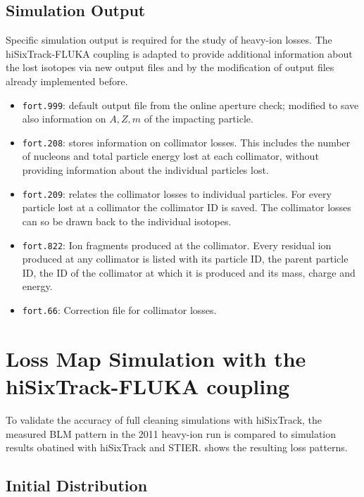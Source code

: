 \subsection{Simulation Output}
Specific simulation output is required for the study of heavy-ion losses. The hiSixTrack-FLUKA coupling is adapted to provide additional information about the lost isotopes via new output files and by the modification of output files already implemented before.

\begin{itemize}
  \item \texttt{fort.999}: default output file from the online aperture check; modified to save also information on $A,Z,m$ of the impacting particle.
  \item \texttt{fort.208}: stores information on collimator losses. This includes the number of nucleons and total particle energy lost at each collimator, without providing information about the individual particles lost. 
  \item \texttt{fort.209}: relates the collimator losses to individual particles. For every particle lost at a collimator the collimator ID is saved. The collimator losses can so be drawn back to the individual isotopes.
  \item \texttt{fort.822}: Ion fragments produced at the collimator. Every residual ion produced at any collimator is listed with its particle ID, the parent particle ID, the ID of the collimator at which it is produced and its mass, charge and energy.
  \item \texttt{fort.66}: Correction file for collimator losses. 
\end{itemize}




\section{Loss Map Simulation with the hiSixTrack-FLUKA coupling}



To validate the accuracy of full cleaning simulations with hiSixTrack, the measured BLM pattern in the 2011 heavy-ion run is compared to simulation results obatined with hiSixTrack and STIER.  shows the resulting loss patterns. 


\subsection{Initial Distribution} \label{chap:pha_shift}

